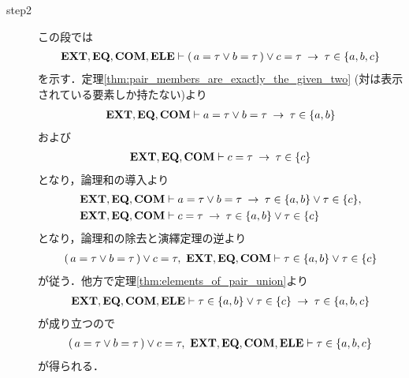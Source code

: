 \begin{sketch}
\begin{description}
			\item[step2]
				この段では
				\begin{align}
					\mbox{{\bf EXT}},\mbox{{\bf EQ}},\mbox{\bf COM},\mbox{{\bf ELE}} \vdash 
					(\, a = \tau \vee b = \tau\, ) \vee c = \tau \hspace{0.25em}\rightarrow\hspace{0.25em} 
					\tau \in \{a,b,c\}
				\end{align}
				を示す．定理\ref{thm:pair_members_are_exactly_the_given_two}
				(対は表示されている要素しか持たない)より
				\begin{align}
					\mbox{{\bf EXT}},\mbox{{\bf EQ}},\mbox{\bf COM} \vdash a = \tau \vee b = \tau 
					\hspace{0.25em}\rightarrow\hspace{0.25em} \tau \in \{a,b\}
				\end{align}
				および
				\begin{align}
					\mbox{{\bf EXT}},\mbox{{\bf EQ}},\mbox{\bf COM} \vdash c = \tau
					\hspace{0.25em}\rightarrow\hspace{0.25em} \tau \in \{c\}
				\end{align}
				となり，論理和の導入より
				\begin{align}
					\mbox{{\bf EXT}},\mbox{{\bf EQ}},\mbox{\bf COM} &\vdash a = \tau \vee b = \tau 
					\hspace{0.25em}\rightarrow\hspace{0.25em} \tau \in \{a,b\} \vee \tau \in \{c\}, \\
					\mbox{{\bf EXT}},\mbox{{\bf EQ}},\mbox{\bf COM} &\vdash c = \tau 
					\hspace{0.25em}\rightarrow\hspace{0.25em} \tau \in \{a,b\} \vee \tau \in \{c\}
				\end{align}
				となり，論理和の除去と演繹定理の逆より
				\begin{align}
					(\, a = \tau \vee b = \tau\, ) \vee c = \tau,\ 
					\EXTAX,\EQAX,\COMAX \vdash \tau \in \{a,b\} \vee \tau \in \{c\}
				\end{align}
				が従う．他方で定理\ref{thm:elements_of_pair_union}より
				\begin{align}
					\mbox{{\bf EXT}},\mbox{{\bf EQ}},\mbox{\bf COM},\mbox{{\bf ELE}} \vdash 
					\tau \in \{a,b\} \vee \tau \in \{c\} 
					\hspace{0.25em}\rightarrow\hspace{0.25em} \tau \in \{a,b,c\}
				\end{align}
				が成り立つので
				\begin{align}
					(\, a = \tau \vee b = \tau\, ) \vee c = \tau,\ 
					\EXTAX,\EQAX,\COMAX,\ELEAX \vdash \tau \in \{a,b,c\}
				\end{align}
				が得られる．
				\QED
		\end{description}
	\end{sketch}
	
	
